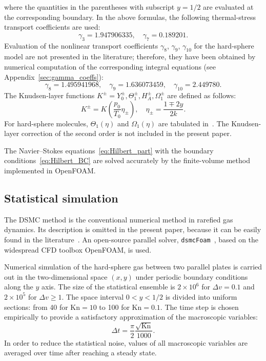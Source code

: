 \documentclass[]{elsarticle} %
\newcommand{\Kn}{\mathrm{Kn}}
\begin{document}
where the quantities in the parentheses with subscript \(y=1/2\) are evaluated at the corresponding boundary.
In the above formulas, the following thermal-stress transport coefficients are used:
\begin{equation}\label{eq:gamma_tabular}
    \gamma_3 = 1.947906335, \quad \gamma_7 = 0.189201.
\end{equation}
Evaluation of the nonlinear transport coefficients \(\gamma_8\), \(\gamma_9\), \(\gamma_{10}\)
for the hard-sphere model are not presented in the literature;
therefore, they have been obtained by numerical computation of the corresponding integral equations
(see Appendix~\ref{sec:gamma_coeffs}):
\begin{equation}\label{eq:gamma_numerical}
    \gamma_8 = 1.495941968, \quad \gamma_9 = 1.636073459, \quad \gamma_{10} = 2.449780.
\end{equation}
The Knudsen-layer functions \(K^\pm = Y_0^\pm, \Theta_1^\pm, H_A^\pm, \Omega_1^\pm\)
are defined as follows:
\begin{equation}\label{eq:nonlinear_knudsen_functions}
     K^\pm = K\left(\frac{p_0}{T_0}\eta_\pm\right), \quad \eta_\pm = \frac{1 \mp 2y}{2k}.
\end{equation}
For hard-sphere molecules, \(\Theta_1(\eta)\) and \(\Omega_1(\eta)\)
are tabulated in~\citet{Ohwada1989jump, Sone2002, Sone2007, Takata2015}.
The Knudsen-layer correction of the second order is not included in the present paper.

The Navier--Stokes equations~\eqref{eq:Hilbert_part}
with the boundary conditions~\eqref{eq:Hilbert_BC}
are solved accurately by the finite-volume method
implemented in OpenFOAM\textregistered{}.

\subsection{Statistical simulation}

The DSMC method is the conventional numerical method in rarefied gas dynamics.
Its description is omitted in the present paper,
because it can be easily found in the literature~\citep[see e.g.][]{Bird1994, Sone2007}.
An open-source parallel solver, \verb+dsmcFoam+~\citep{Reese2010},
based on the widespread CFD toolbox OpenFOAM\textregistered{}, is used.

Numerical simulation of the hard-sphere gas between two parallel plates is carried out
in the two-dimensional space \((x,y)\) under periodic boundary conditions along the \(y\) axis.
The size of the statistical ensemble is \(2\times10^6\) for \(\Delta{v}=0.1\)
and \(2\times10^5\) for \(\Delta{v}\ge1\).
The space interval \(0<y<1/2\) is divided into uniform sections:
from 40 for \(\Kn=10\) to 100 for \(\Kn=0.1\).
The time step is chosen empirically to provide a satisfactory approximation of the macroscopic variables:
\begin{equation}\label{eq:dsmc_timestep}
    \Delta{t} = \frac{\pi}2 \frac{\sqrt{\Kn}}{1000}.
\end{equation}
In order to reduce the statistical noise, values of all macroscopic variables
are averaged over time after reaching a steady state.
\end{document}
